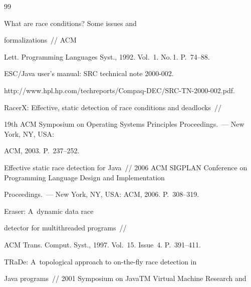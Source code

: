 {\small\frenchspacing

{%


\begin{thebibliography}{99}


 What are race conditions? Some issues and

 formalizations~/\!\!/ ACM

Lett. Programming Languages Syst., 1992. Vol.~1. No.\,1. P.~74--88.




 ESC/Java user's manual: SRC technical note 2000-002.

{\sf http://www.hpl.hp.com/techreports/Compaq-DEC/SRC-TN-2000-002.pdf}.




 RacerX: Effective, static detection of race conditions and deadlocks~/\!\!/

 19th ACM Symposium on Operating Systems Principles Proceedings.~--- New York, NY, USA:

ACM, 2003. P.~237--252.




 Effective static race detection for Java~/\!\!/ 2006 ACM SIGPLAN Conference on Programming Language Design and Implementation

Proceedings.~--- New York, NY, USA: ACM, 2006. P.~308--319.





Eraser: A~dynamic data race

detector for multithreaded programs~/\!\!/

ACM Trans. Comput. Syst., 1997. Vol.~15. Issue~4. P.~391--411.




 TRaDe: A~topological approach to on-the-fly race detection in

Java programs~/\!\!/ 2001 Symposium on JavaTM Virtual Machine Research and


\end{thebibliography}}}

